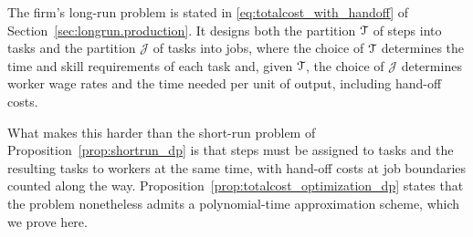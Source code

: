 The firm's long-run problem is stated in \eqref{eq:totalcost_with_handoff} of Section~\ref{sec:longrun.production}.
It designs both the partition $\mathcal{T}$ of steps into tasks and the partition $\mathcal{J}$ of tasks into jobs, where the choice of $\mathcal{T}$ determines the time and skill requirements of each task and, given $\mathcal{T}$, the choice of $\mathcal{J}$ determines worker wage rates and the time needed per unit of output, including hand-off costs.

What makes this harder than the short-run problem of Proposition~\ref{prop:shortrun_dp} is that steps must be assigned to tasks and the resulting tasks to workers at the same time, with hand-off costs at job boundaries counted along the way.
Proposition~\ref{prop:totalcost_optimization_dp} states that the problem nonetheless admits a polynomial-time approximation scheme, which we prove here.


